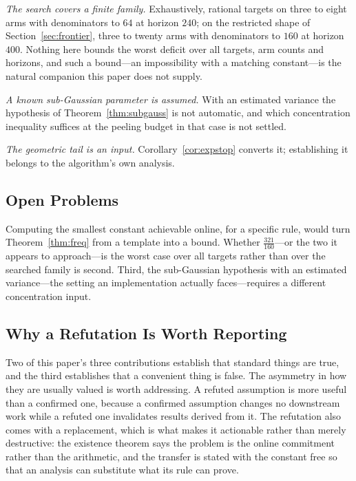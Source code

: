 \documentclass[conference]{IEEEtran}
\theoremstyle{definition}
\begin{document}
\emph{The search covers a finite family.} Exhaustively, rational targets on three to eight
arms with denominators to $64$ at horizon $240$; on the restricted shape of
Section~\ref{sec:frontier}, three to twenty arms with denominators to $160$ at horizon $400$. Nothing here bounds the worst deficit over all
targets, arm counts and horizons, and such a bound---an impossibility with a matching
constant---is the natural companion this paper does not supply.

\emph{A known sub-Gaussian parameter is assumed.} With an estimated variance the hypothesis of
Theorem~\ref{thm:subgauss} is not automatic, and which concentration inequality suffices at the
peeling budget in that case is not settled.

\emph{The geometric tail is an input.} Corollary~\ref{cor:expstop} converts it; establishing it
belongs to the algorithm's own analysis.

\subsection{Open Problems}

Computing the smallest constant achievable online, for a specific rule, would turn
Theorem~\ref{thm:freq} from a template into a bound. Whether $\tfrac{321}{160}$---or the two
it appears to approach---is the worst case over
all targets rather than over the searched family is second. Third, the sub-Gaussian hypothesis
with an estimated variance---the setting an implementation actually faces---requires a
different concentration input.

\subsection{Why a Refutation Is Worth Reporting}

Two of this paper's three contributions establish that standard things are true, and the third
establishes that a convenient thing is false. The asymmetry in how they are usually valued is
worth addressing. A refuted assumption is more useful than a confirmed one, because a confirmed
assumption changes no downstream work while a refuted one invalidates results derived from it.
The refutation also comes with a replacement, which is what makes it actionable rather than
merely destructive: the existence theorem says the problem is the online commitment rather than
the arithmetic, and the transfer is stated with the constant free so that an analysis can
substitute what its rule can prove.
\end{document}

